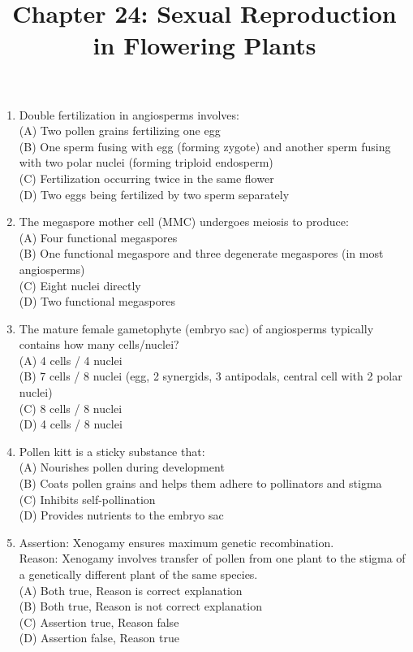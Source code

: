 \documentclass{article}
\begin{document}
\title{Chapter 24: Sexual Reproduction in Flowering Plants}
\date{}
\maketitle

\begin{enumerate}[label=Q\arabic*.]

\item Double fertilization in angiosperms involves:
\\(A) Two pollen grains fertilizing one egg
\\(B) One sperm fusing with egg (forming zygote) and another sperm fusing with two polar nuclei (forming triploid endosperm)
\\(C) Fertilization occurring twice in the same flower
\\(D) Two eggs being fertilized by two sperm separately

\item The megaspore mother cell (MMC) undergoes meiosis to produce:
\\(A) Four functional megaspores
\\(B) One functional megaspore and three degenerate megaspores (in most angiosperms)
\\(C) Eight nuclei directly
\\(D) Two functional megaspores

\item The mature female gametophyte (embryo sac) of angiosperms typically contains how many cells/nuclei?
\\(A) 4 cells / 4 nuclei
\\(B) 7 cells / 8 nuclei (egg, 2 synergids, 3 antipodals, central cell with 2 polar nuclei)
\\(C) 8 cells / 8 nuclei
\\(D) 4 cells / 8 nuclei

\item Pollen kitt is a sticky substance that:
\\(A) Nourishes pollen during development
\\(B) Coats pollen grains and helps them adhere to pollinators and stigma
\\(C) Inhibits self-pollination
\\(D) Provides nutrients to the embryo sac

\item Assertion: Xenogamy ensures maximum genetic recombination.\\
Reason: Xenogamy involves transfer of pollen from one plant to the stigma of a genetically different plant of the same species.
\\(A) Both true, Reason is correct explanation
\\(B) Both true, Reason is not correct explanation
\\(C) Assertion true, Reason false
\\(D) Assertion false, Reason true


\end{enumerate}
\end{document}
